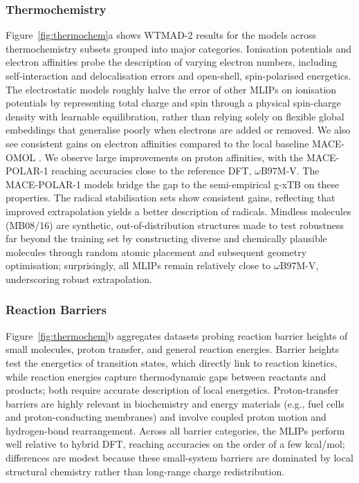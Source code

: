 \documentclass[aps,%
superscriptaddress,
 amsmath,amssymb,
floatfix,
twocolumn
]{revtex4-2}
\newcommand{\MOMOL}{MACE-OMOL }
\newcommand{\MFP}{MACE-POLAR-1 }
\newcommand{\wb}{$\omega$B97M-V}
\begin{document}


\subsubsection{Thermochemistry} Figure~\ref{fig:thermochem}a shows WTMAD-2 results for the models across thermochemistry subsets grouped into major categories. Ionisation potentials and electron affinities probe the description of varying electron numbers, including self-interaction and delocalisation errors and open-shell, spin-polarised energetics. The electrostatic models roughly halve the error of other MLIPs on ionisation potentials by representing total charge and spin through a physical spin-charge density with learnable equilibration, rather than relying solely on flexible global embeddings that generalise poorly when electrons are added or removed. We also see consistent gains on electron affinities compared to the local baseline \MOMOL. We observe large improvements on proton affinities, with the \MFP reaching accuracies close to the reference DFT, \wb. The \MFP models bridge the gap to the semi-empirical g-xTB on these properties. The radical stabilisation sets show consistent gains, reflecting that improved extrapolation yields a better description of radicals. Mindless molecules (MB08/16) are synthetic, out-of-distribution structures made to test robustness far beyond the training set by constructing diverse and chemically plausible molecules through random atomic placement and subsequent geometry optimisation; surprisingly, all MLIPs remain relatively close to \wb{}, underscoring robust extrapolation.

\subsubsection{Reaction Barriers} Figure~\ref{fig:thermochem}b aggregates datasets probing reaction barrier heights of small molecules, proton transfer, and general reaction energies.
Barrier heights test the energetics of transition states, which directly link to reaction kinetics, while reaction energies capture thermodynamic gaps between reactants and products; both require accurate description of local energetics. Proton-transfer barriers are highly relevant in biochemistry and energy materials (e.g., fuel cells and proton-conducting membranes) and involve coupled proton motion and hydrogen-bond rearrangement. Across all barrier categories, the MLIPs perform well relative to hybrid DFT, reaching accuracies on the order of a few kcal/mol; differences are modest because these small-system barriers are dominated by local structural chemistry rather than long-range charge redistribution.
\end{document}
